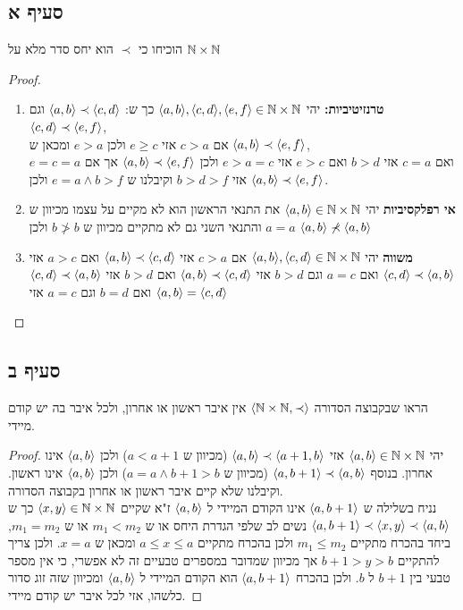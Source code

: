 \documentclass{article}
\begin{document}
	\subsection*{סעיף א}
	הוכיחו כי $\prec$ הוא יחס סדר מלא על $\mathbb{N} \times \mathbb{N}$
	\begin{proof}
		\begin{enumerate}
			\item \textbf{טרנזיטיביות:} יהי $\langle a,b \rangle, \langle c,d \rangle, \langle e,f \rangle \in \mathbb{N} \times \mathbb{N}$ כך ש: $\langle a,b \rangle \prec \langle c,d \rangle$ וגם $\langle c,d \rangle \prec \langle e,f \rangle$, \\
			אם $c > a$ אזי $e \geq c$ ולכן $e > a$ ומכאן ש $\langle a,b \rangle \prec \langle e,f \rangle$, \\
			ואם $c=a$ אזי $b > d$ ואם $e > c$ אזי $e > a = c$ ולכן $\langle a,b \rangle \prec \langle e,f \rangle$
			אך אם $e=c=a$ אזי $b > d > f$ וקיבלנו ש $e=a \land b > f$ ולכן $\langle a,b \rangle \prec \langle e,f \rangle$.

			\item \textbf{אי רפלקסיביות} יהי $\langle a,b \rangle \in \mathbb{N} \times \mathbb{N}$ את התנאי הראשון הוא לא מקיים על עצמו מכיוון ש $a=a$ והתנאי השני גם לא מתקיים מכיוון ש $b \not> b$ ולכן $\langle a,b \rangle \not\prec \langle a,b \rangle$

			\item \textbf{משווה} יהי $\langle a,b \rangle, \langle c,d \rangle \in \mathbb{N} \times \mathbb{N}$ אם $c > a$ אזי $\langle a,b \rangle \prec \langle c,d \rangle$
			ואם $a > c$ אזי $\langle c,d \rangle \prec \langle a,b \rangle$ ואם $a=c$ וגם $b>d$ אזי $\langle a,b \rangle \prec \langle c,d \rangle$ ואם $b>d$ אזי $\langle c,d \rangle \prec \langle a,b \rangle$
			ואם $b=d$ וגם $a=c$ אזי $\langle a,b \rangle = \langle c,d \rangle$
		\end{enumerate}
	\end{proof}

	\subsection*{סעיף ב}
	הראו שבקבוצה הסדורה  $\langle \mathbb{N} \times \mathbb{N}, \prec \rangle$ אין איבר ראשון או אחרון, ולכל איבר בה יש קודם מיידי.
	\begin{proof}
		יהי $\langle a,b \rangle \in \mathbb{N} \times \mathbb{N}$ אזי $\langle a,b \rangle \prec \langle a+1, b \rangle$ (מכיוון ש $a < a+1$)
		ולכן $\langle a,b \rangle$ אינו אחרון. בנוסף $\langle a, b+1 \rangle \prec \langle a,b \rangle$ (מכיוון ש $a=a \land b+1 > b$) ולכן $\langle a,b \rangle$ אינו ראשון.
		וקיבלנו שלא קיים איבר ראשון או אחרון בקבוצה הסדורה. \\
		נניח בשלילה ש $\langle a, b+1 \rangle$ אינו הקודם המיידי ל $\langle a,b \rangle$ ז"א שקיים $\langle x,y \rangle \in \mathbb{N} \times \mathbb{N}$
		כך ש $\langle a, b+1 \rangle \prec \langle x,y \rangle \prec \langle a,b \rangle$
		נשים לב שלפי הגדרת היחס או ש $m_1 < m_2$ או ש $m_1 = m_2$, ביחד בהכרח מתקיים $m_1 \leq m_2$
		ולכן בהכרח מתקיים $a \leq x \leq a$ ומכאן ש $x=a$.
		ולכן צריך להתקיים $b+1 > y > b$ אך מכיוון שמדובר במספרים טבעיים זה לא אפשרי, כי אין מספר טבעי בין $b+1$ ל $b$.
		ולכן בהכרח $\langle a, b+1 \rangle$ הוא הקודם המיידי ל $\langle a,b \rangle$ ומכיוון שזה זוג סדור כלשהו, אזי לכל איבר יש קודם מיידי.
	\end{proof}
\end{document}

